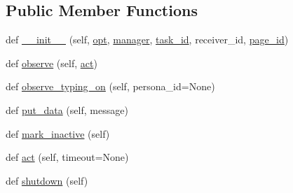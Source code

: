 \subsection*{Public Member Functions}
\begin{DoxyCompactItemize}
\item 
def \hyperlink{classparlai_1_1chat__service_1_1services_1_1messenger_1_1agents_1_1MessengerAgent_a5ddfb3f99c66a6f6c439a3ab2c6e23d7}{\+\_\+\+\_\+init\+\_\+\+\_\+} (self, \hyperlink{classparlai_1_1core_1_1agents_1_1Agent_ab3b45d2754244608c75d4068b90cd051}{opt}, \hyperlink{classparlai_1_1chat__service_1_1core_1_1agents_1_1ChatServiceAgent_a8216a688db46e2aa7cdd023016ecf27c}{manager}, \hyperlink{classparlai_1_1chat__service_1_1core_1_1agents_1_1ChatServiceAgent_a1f1f978765ae81ca5ec8d04d14575386}{task\+\_\+id}, receiver\+\_\+id, \hyperlink{classparlai_1_1chat__service_1_1services_1_1messenger_1_1agents_1_1MessengerAgent_aefc5070a7daf467a856cecb4be055d84}{page\+\_\+id})
\item 
def \hyperlink{classparlai_1_1chat__service_1_1services_1_1messenger_1_1agents_1_1MessengerAgent_aed8303ffef9e83bb5071ce7ab4f77bc6}{observe} (self, \hyperlink{classparlai_1_1chat__service_1_1services_1_1messenger_1_1agents_1_1MessengerAgent_a50484a75fb326cade0cb5c2b8a0614ac}{act})
\item 
def \hyperlink{classparlai_1_1chat__service_1_1services_1_1messenger_1_1agents_1_1MessengerAgent_af108212b0aa675814aa439247396abc4}{observe\+\_\+typing\+\_\+on} (self, persona\+\_\+id=None)
\item 
def \hyperlink{classparlai_1_1chat__service_1_1services_1_1messenger_1_1agents_1_1MessengerAgent_a4a050f12b4223f41e1d499c3cb334ca7}{put\+\_\+data} (self, message)
\item 
def \hyperlink{classparlai_1_1chat__service_1_1services_1_1messenger_1_1agents_1_1MessengerAgent_a54599a1e6c1f72fb4d18775752de3884}{mark\+\_\+inactive} (self)
\item 
def \hyperlink{classparlai_1_1chat__service_1_1services_1_1messenger_1_1agents_1_1MessengerAgent_a50484a75fb326cade0cb5c2b8a0614ac}{act} (self, timeout=None)
\item 
def \hyperlink{classparlai_1_1chat__service_1_1services_1_1messenger_1_1agents_1_1MessengerAgent_a84f14647eaa8536cad36813d02206949}{shutdown} (self)
\end{DoxyCompactItemize}
